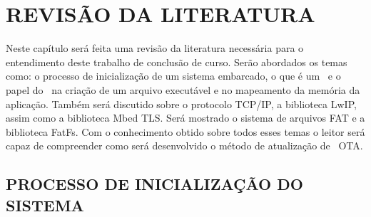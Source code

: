 
\chapter{REVISÃO DA LITERATURA}
\label{chap:fundamentacaoTeorica}
Neste capítulo será feita uma revisão da literatura necessária para o entendimento deste trabalho de conclusão de curso. 
Serão abordados os temas como: o processo de inicialização de um sistema embarcado, o que é um \bootloader\ e o papel do \linker\ na criação de um arquivo executável e no mapeamento da memória da aplicação.
Também será discutido sobre o protocolo TCP/IP, a biblioteca LwIP, assim como a biblioteca Mbed TLS.
Será mostrado o sistema de arquivos FAT e a biblioteca FatFs.
Com o conhecimento obtido sobre todos esses temas o leitor será capaz de compreender como será desenvolvido o método de atualização de \firmware\ OTA.


\section{PROCESSO DE INICIALIZAÇÃO DO SISTEMA}

